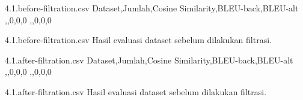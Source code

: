 \begin{filecontents*}{4.1.before-filtration.csv}
  Dataset,Jumlah,Cosine Similarity,BLEU-back,BLEU-alt
  ,,0,0,0
  ,,0,0,0
\end{filecontents*}
  {4.1.before-filtration.csv}
  {Hasil evaluasi dataset sebelum dilakukan filtrasi.}

\begin{filecontents*}{4.1.after-filtration.csv}
  Dataset,Jumlah,Cosine Similarity,BLEU-back,BLEU-alt
  ,,0,0,0
  ,,0,0,0
\end{filecontents*}
  {4.1.after-filtration.csv}
  {Hasil evaluasi dataset sebelum dilakukan filtrasi.}

